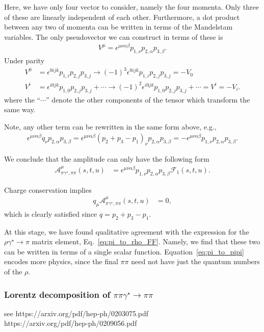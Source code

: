 Here, we have only four vector to consider, namely the four momenta. Only three of these are linearly independent of each other. Furthermore, a dot product between any two of momenta can be written in terms of the Mandelstam variables. The only pseudovector we can construct in terms of these is 
\begin{align}
V^\mu=\epsilon^{\mu\nu\alpha\beta}p_{1,\nu}p_{2,\alpha}p_{3,\beta}.
\end{align}
Under parity
\begin{align}
V^0&=\epsilon^{0ijk}p_{1,i}p_{2,j}p_{3,j}\to
(-1)^3\epsilon^{0ijk}p_{1,i}p_{2,j}p_{3,j}=-V_0\\
V^i&=\epsilon^{i0jk}p_{1,0}p_{2,j}p_{3,j}+\cdots\to
(-1)^2\epsilon^{i0jk}p_{1,0}p_{2,j}p_{3,j}+\cdots=V^i=-V_i.
\end{align}
where the ``$\cdots$'' denote the other components of the tensor which transform the same way. 

Note, any other term can be rewritten in the same form above, e.g.,
\begin{align}
\epsilon^{\mu\nu\alpha\beta}q_{\nu}p_{2,\alpha}p_{3,\beta}
=\epsilon^{\mu\nu\alpha\beta}(p_{2}+p_{3}-p_{1})_{\nu}p_{2,\alpha}p_{3,\beta}
=-\epsilon^{\mu\nu\alpha\beta}p_{1,\nu}p_{2,\alpha}p_{3,\beta}.
\end{align}

We conclude that the amplitude can only have the following form
\begin{align}
\mathcal{A}^{\mu}_{\pi\gamma^\star,\pi\pi}(s,t,u)&=
\epsilon^{\mu\nu\alpha\beta}p_{1,\nu}p_{2,\alpha}p_{3,\beta}\mathcal{F}_{1}(s,t,u).
\label{eq:pi_to_pipi}
\end{align}



Charge conservation implies
\begin{align}
q_\mu\mathcal{A}^{\mu}_{\pi\gamma^\star,\pi\pi}(s,t,u)&=0,
\end{align}
which is clearly satisfied since $q=p_{2}+p_{3}-p_{1}$. 

At this stage, we have found qualitative agreement with the expression for the $\rho\gamma^\star\to\pi$ matrix element, Eq.~\ref{eq:pi_to_rho_FF}. Namely, we find that these two can be written in terms of a single scalar function. Equation~\ref{eq:pi_to_pipi} encodes more physics, since the final $\pi\pi$ need not have just the quantum numbers of the $\rho$. 

\subsubsection{Lorentz decomposition of $\pi\pi\gamma^\star\to\pi\pi$}
{\raul see https://arxiv.org/pdf/hep-ph/0203075.pdf\\
https://arxiv.org/pdf/hep-ph/0209056.pdf}

